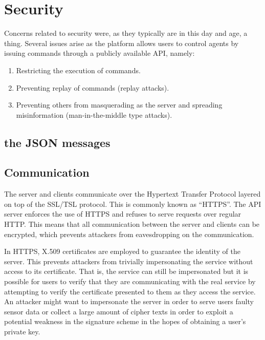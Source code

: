\section{Security}
Concerns related to security were, as they typically are in this day and age, a thing.
Several issues arise as the platform allows users to control agents by issuing commands through a publicly available API, namely:

\begin{enumerate}
	\item Restricting the execution of commands.
	\item Preventing replay of commands (replay attacks).
	\item Preventing others from masquerading as the server and spreading misinformation (man-in-the-middle type attacks).
\end{enumerate}

\subsection{the JSON messages}

\subsection{Communication}
The server and clients communicate over the Hypertext Transfer Protocol layered on top of the SSL/TSL protocol. %
This is commonly known as ``HTTPS''.
The API server enforces the use of HTTPS and refuses to serve requests over regular HTTP.
This means that all communication between the server and clients can be encrypted, which prevents attackers from eavesdropping on the communication.

In HTTPS, X.509 certificates are employed to guarantee the identity of the server.
This prevents attackers from trivially impersonating the service without access to its certificate.
That is, the service can still be impersonated but it is possible for users to verify that they are communicating with the real service by attempting to verify the certificate presented to them as they access the service.
An attacker might want to impersonate the server in order to serve users faulty sensor data or collect a large amount of cipher texts in order to exploit a potential weakness in the signature scheme in the hopes of obtaining a user's private key.

